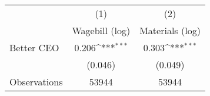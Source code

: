 {
\def\sym#1{\ifmmode^{#1}\else\(^{#1}\)\fi}
\begin{tabular}{l*{2}{c}}
\hline\hline
                    &\multicolumn{1}{c}{(1)}&\multicolumn{1}{c}{(2)}\\
                    &\multicolumn{1}{c}{Wagebill (log)}&\multicolumn{1}{c}{Materials (log)}\\
\hline
Better CEO          &       0.206\sym{***}&       0.303\sym{***}\\
                    &     (0.046)         &     (0.049)         \\
\hline
Observations        &       53944         &       53944         \\
\hline\hline
\end{tabular}
}
